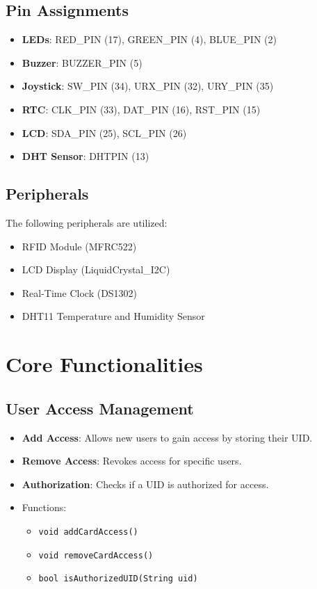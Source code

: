\documentclass[a4paper,12pt]{report}
\begin{document}
\subsection{Pin Assignments}
\begin{itemize}
    \item \textbf{LEDs}: RED\_PIN (17), GREEN\_PIN (4), BLUE\_PIN (2)
    \item \textbf{Buzzer}: BUZZER\_PIN (5)
    \item \textbf{Joystick}: SW\_PIN (34), URX\_PIN (32), URY\_PIN (35)
    \item \textbf{RTC}: CLK\_PIN (33), DAT\_PIN (16), RST\_PIN (15)
    \item \textbf{LCD}: SDA\_PIN (25), SCL\_PIN (26)
    \item \textbf{DHT Sensor}: DHTPIN (13)
\end{itemize}

\subsection{Peripherals}
The following peripherals are utilized:
\begin{itemize}
    \item RFID Module (MFRC522)
    \item LCD Display (LiquidCrystal\_I2C)
    \item Real-Time Clock (DS1302)
    \item DHT11 Temperature and Humidity Sensor
\end{itemize}

\section{Core Functionalities}
\subsection{User Access Management}
\begin{itemize}
    \item \textbf{Add Access}: Allows new users to gain access by storing their UID.
    \item \textbf{Remove Access}: Revokes access for specific users.
    \item \textbf{Authorization}: Checks if a UID is authorized for access.
    \item Functions:
    \begin{itemize}
        \item \texttt{void addCardAccess()}
        \item \texttt{void removeCardAccess()}
        \item \texttt{bool isAuthorizedUID(String uid)}
    \end{itemize}
\end{itemize}
\end{document}

